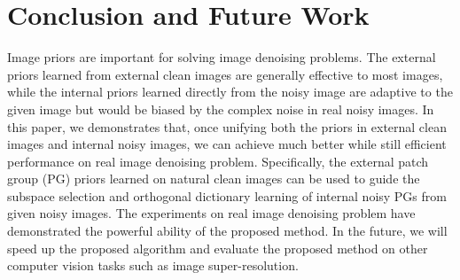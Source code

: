 \documentclass[10pt,twocolumn,letterpaper]{article}
\begin{document}
\section{Conclusion and Future Work}

Image priors are important for solving image denoising problems. The external priors learned from external clean images are generally effective to most images, while the internal priors learned directly from the noisy image are adaptive to the given image but would be biased by the complex noise in real noisy images. In this paper, we demonstrates that, once unifying both the priors in external clean images and internal noisy images, we can achieve much better while still efficient performance on real image denoising problem. Specifically, the external patch group (PG) priors learned on natural clean images can be used to guide the subspace selection and orthogonal dictionary learning of internal noisy PGs from given noisy images. The experiments on real image denoising problem have demonstrated the powerful ability of the proposed method. In the future, we will speed up the proposed algorithm and evaluate the proposed method on other computer vision tasks such as image super-resolution.

\clearpage
{
\small


}
\end{document}
